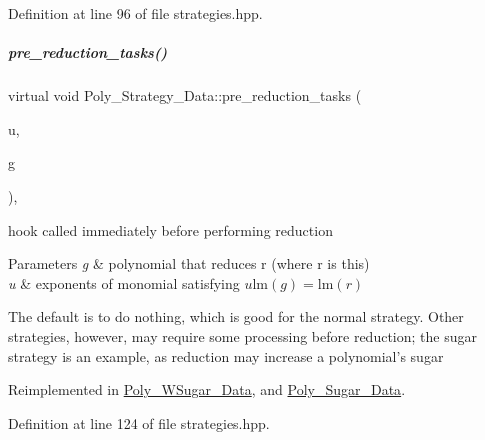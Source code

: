 Definition at line 96 of file strategies.\+hpp.

\mbox{\label{group__strategygroup_a0d71db50c58a24f48f94eae6a48c2149}} 
\subparagraph{\texorpdfstring{pre\+\_\+reduction\+\_\+tasks()}{pre\_reduction\_tasks()}}
{\footnotesize\ttfamily virtual void Poly\+\_\+\+Strategy\+\_\+\+Data\+::pre\+\_\+reduction\+\_\+tasks (\begin{DoxyParamCaption}\item[{const E\+X\+P\+\_\+\+T\+Y\+PE $\ast$}]{u,  }\item[{const \hyperlink{group__polygroup_class_abstract___polynomial}{Abstract\+\_\+\+Polynomial} \&}]{g }\end{DoxyParamCaption})\hspace{0.3cm}{\ttfamily [inline]}, {\ttfamily [virtual]}}



hook called immediately before performing reduction 


\begin{DoxyParams}{Parameters}
{\em g} & polynomial that reduces {\ttfamily r} (where {\ttfamily r} is {\ttfamily this}) \\
\hline
{\em u} & exponents of monomial satisfying $u\textrm{lm}(g)=\textrm{lm}(r)$\\
\hline
\end{DoxyParams}
The default is to do nothing, which is good for the normal strategy. Other strategies, however, may require some processing before reduction; the sugar strategy is an example, as reduction may increase a polynomial's sugar 

Reimplemented in \hyperlink{group__strategygroup_a4a34039eb50a2294d2aaf6245c1833b8}{Poly\+\_\+\+W\+Sugar\+\_\+\+Data}, and \hyperlink{group__strategygroup_a1b2e8a7fe4fcd57555fa58e48620b2bf}{Poly\+\_\+\+Sugar\+\_\+\+Data}.



Definition at line 124 of file strategies.\+hpp.


